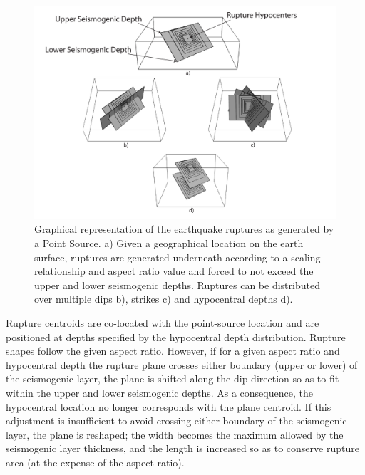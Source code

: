 \begin{figure}
\centering
\includegraphics[width=14cm]{./Pictures/PointSource.pdf}
\caption{Graphical representation of the earthquake ruptures as generated by a Point Source. a) Given a geographical location on the earth surface, ruptures are generated underneath according to a scaling relationship and aspect ratio value and forced to not exceed the upper and lower seismogenic depths. Ruptures can be distributed over multiple dips b), strikes c) and hypocentral depths d).}
\label{fig:PointSource}
\end{figure}
Rupture centroids are co-located with the point-source location and are positioned at depths specified by the hypocentral depth distribution. Rupture shapes follow the given aspect ratio. However, if for a given aspect ratio and hypocentral depth the rupture plane crosses either boundary (upper or lower) of the seismogenic layer, the plane is shifted along the dip direction so as to fit within the upper and lower seismogenic depths. As a consequence, the hypocentral location no longer corresponds with the plane centroid. If this adjustment is insufficient to avoid crossing either boundary of the seismogenic layer, the plane is reshaped; the width becomes the maximum allowed by the seismogenic layer thickness, and the length is increased so as to conserve rupture area (at the expense of the aspect ratio).

